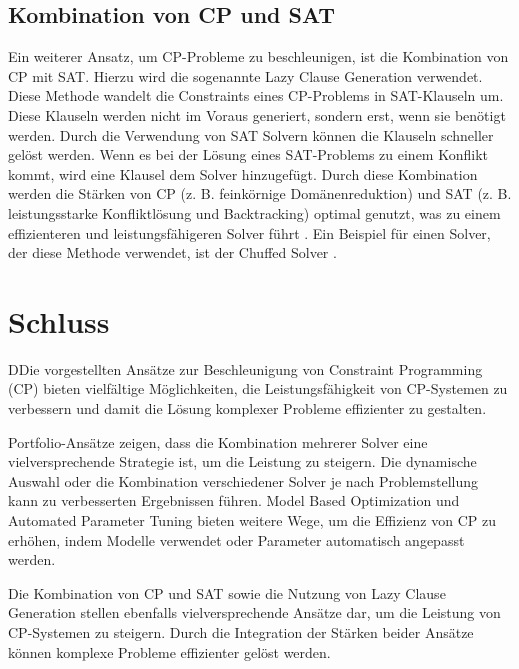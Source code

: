   
\subsection{Kombination von CP und SAT}
\label{sec:Kombination-von-CP-und-SAT}

Ein weiterer Ansatz, um CP-Probleme zu beschleunigen, ist die Kombination von CP
mit SAT. Hierzu wird die sogenannte Lazy Clause Generation verwendet. Diese
Methode wandelt die Constraints eines CP-Problems in SAT-Klauseln um. Diese
Klauseln werden nicht im Voraus generiert, sondern erst, wenn sie benötigt
werden. Durch die Verwendung von SAT Solvern können die Klauseln schneller
gelöst werden. Wenn es bei der Lösung eines SAT-Problems zu einem Konflikt
kommt, wird eine Klausel dem Solver hinzugefügt. Durch diese Kombination werden
die Stärken von CP (z. B. feinkörnige Domänenreduktion) und SAT (z. B.
leistungsstarke Konfliktlösung und Backtracking) optimal genutzt, was zu einem
effizienteren und leistungsfähigeren Solver führt \cite[5]{goosjo}. Ein Beispiel
für einen Solver, der diese Methode verwendet, ist der Chuffed Solver
\cite{Chuff24co}.


  

  

\section{Schluss}
\label{sec:Schluss}
DDie vorgestellten Ansätze zur Beschleunigung von Constraint Programming (CP)
bieten vielfältige Möglichkeiten, die Leistungsfähigkeit von CP-Systemen zu
verbessern und damit die Lösung komplexer Probleme effizienter zu gestalten.

Portfolio-Ansätze zeigen, dass die Kombination mehrerer Solver eine
vielversprechende Strategie ist, um die Leistung zu steigern. Die dynamische
Auswahl oder die Kombination verschiedener Solver je nach Problemstellung kann
zu verbesserten Ergebnissen führen. Model Based Optimization und Automated
Parameter Tuning bieten weitere Wege, um die Effizienz von CP zu erhöhen, indem
Modelle verwendet oder Parameter automatisch angepasst werden.

Die Kombination von CP und SAT sowie die Nutzung von Lazy Clause Generation
stellen ebenfalls vielversprechende Ansätze dar, um die Leistung von CP-Systemen
zu steigern. Durch die Integration der Stärken beider Ansätze können komplexe
Probleme effizienter gelöst werden.

